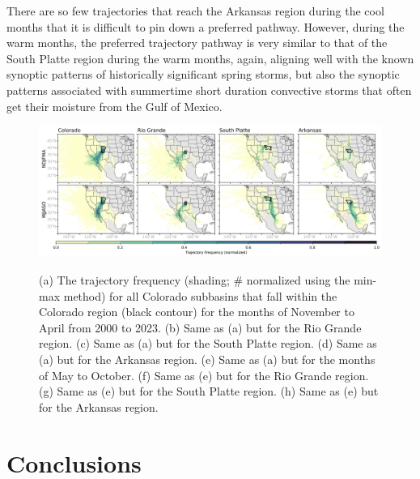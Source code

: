 \documentclass[draft]{agujournal2019}
\begin{document}
There are so few trajectories that reach the Arkansas region during the cool months that it is difficult to pin down a preferred pathway. However, during the warm months, the preferred trajectory pathway is very similar to that of the South Platte region during the warm months, again, aligning well with the known synoptic patterns of historically significant spring storms, but also the synoptic patterns associated with summertime short duration convective storms that often get their moisture from the Gulf of Mexico. 


\begin{figure}
\includegraphics{fig6.png}
\label{fig:heatmaps}
\caption{(a) The trajectory frequency (shading; \# normalized using the min-max method) for all Colorado subbasins that fall within the Colorado region (black contour) for the months of November to April from 2000 to 2023. (b) Same as (a) but for the Rio Grande region. (c) Same as (a) but for the South Platte region. (d) Same as (a) but for the Arkansas region. (e) Same as (a) but for the months of May to October. (f) Same as (e) but for the Rio Grande region. (g) Same as (e) but for the South Platte region. (h) Same as (e) but for the Arkansas region.}
\end{figure}


\section{Conclusions}
\label{conclusions}
\end{document}

